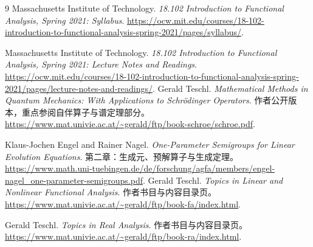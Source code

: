 \documentclass[UTF8,12pt,a4paper,fontset=fandol]{ctexbook}
\begin{document}
\begin{thebibliography}{9}
Massachusetts Institute of Technology.
\emph{18.102 Introduction to Functional Analysis, Spring 2021: Syllabus}.
\url{https://ocw.mit.edu/courses/18-102-introduction-to-functional-analysis-spring-2021/pages/syllabus/}.

Massachusetts Institute of Technology.
\emph{18.102 Introduction to Functional Analysis, Spring 2021: Lecture Notes and Readings}.
\url{https://ocw.mit.edu/courses/18-102-introduction-to-functional-analysis-spring-2021/pages/lecture-notes-and-readings/}.
Gerald Teschl.
\emph{Mathematical Methods in Quantum Mechanics: With Applications to Schrödinger Operators}.
作者公开版本，重点参阅自伴算子与谱定理部分。
\url{https://www.mat.univie.ac.at/~gerald/ftp/book-schroe/schroe.pdf}.

Klaus-Jochen Engel and Rainer Nagel.
\emph{One-Parameter Semigroups for Linear Evolution Equations}.
第二章：生成元、预解算子与生成定理。
\url{https://www.math.uni-tuebingen.de/de/forschung/agfa/members/engel-nagel_one-parameter-semigroups.pdf}.
Gerald Teschl.
\emph{Topics in Linear and Nonlinear Functional Analysis}.
作者书目与内容目录页。
\url{https://www.mat.univie.ac.at/~gerald/ftp/book-fa/index.html}.

Gerald Teschl.
\emph{Topics in Real Analysis}.
作者书目与内容目录页。
\url{https://www.mat.univie.ac.at/~gerald/ftp/book-ra/index.html}.
\end{thebibliography}
\end{document}
